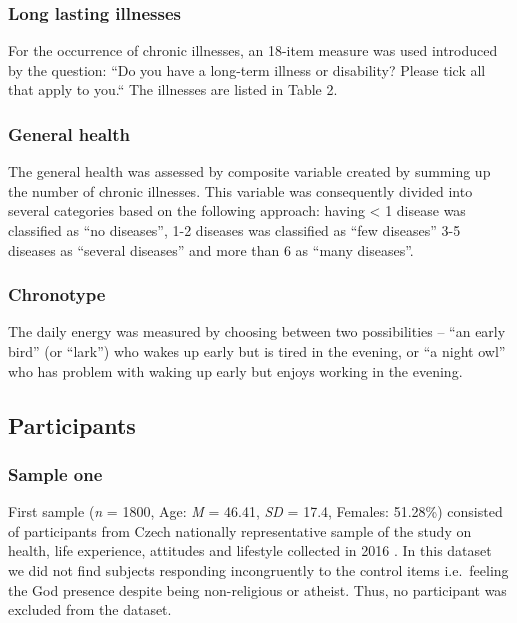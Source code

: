 \documentclass[ijerph,article,accept,moreauthors,pdftex]{mdpi}
\begin{document}
\hypertarget{long-lasting-illnesses}{%
\subsubsection{Long lasting illnesses}\label{long-lasting-illnesses}}

For the occurrence of chronic illnesses, an 18-item measure was used
introduced by the question: ``Do you have a long-term illness or
disability? Please tick all that apply to you.`` The illnesses are
listed in Table 2.

\hypertarget{general-health}{%
\subsubsection{General health}\label{general-health}}

The general health was assessed by composite variable created by summing
up the number of chronic illnesses. This variable was consequently
divided into several categories based on the following approach: having
\textless{} 1 disease was classified as ``no diseases'', 1-2 diseases
was classified as ``few diseases'' 3-5 diseases as ``several diseases''
and more than 6 as ``many diseases''.

\hypertarget{chronotype}{%
\subsubsection{Chronotype}\label{chronotype}}

The daily energy was measured by choosing between two possibilities --
``an early bird'' (or ``lark'') who wakes up early but is tired in the
evening, or ``a night owl'' who has problem with waking up early but
enjoys working in the evening.

\hypertarget{participants}{%
\subsection{Participants}\label{participants}}

\hypertarget{sample-one}{%
\subsubsection{Sample one}\label{sample-one}}

First sample (\emph{n} = 1800, Age: \emph{M} = 46.41, \emph{SD} = 17.4,
Females: 51.28\%) consisted of participants from Czech nationally
representative sample of the study on health, life experience, attitudes
and lifestyle collected in 2016 \citep{malinakova2020religiosity}. In
this dataset we did not find subjects responding incongruently to the
control items i.e.~feeling the God presence despite being non-religious
or atheist. Thus, no participant was excluded from the dataset.
\end{document}
